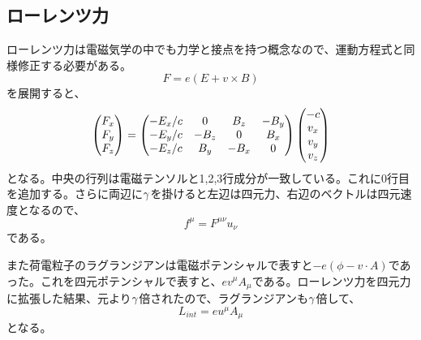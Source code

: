 \subsection{ローレンツ力}
    ローレンツ力は電磁気学の中でも力学と接点を持つ概念なので、運動方程式と同様修正する必要がある。
        \[F = e(E+v\times B)\]
    を展開すると、
    \[
        \begin{pmatrix} F_x\\F_y\\F_z \end{pmatrix}
        = \begin{pmatrix} 
            -E_x/c & 0 & B_z & -B_y\\
            -E_y/c & -B_z & 0 & B_x\\
            -E_z/c & B_y & -B_x & 0 \end{pmatrix}
        \begin{pmatrix} -c\\v_x\\v_y\\v_z \end{pmatrix}
    \]
    となる。中央の行列は電磁テンソルと1,2,3行成分が一致している。これに0行目を追加する。さらに両辺に$\gamma$を掛けると左辺は四元力、右辺のベクトルは四元速度となるので、
        \[f^\mu = F^{\mu\nu}u_\nu\]
    である。

    また荷電粒子のラグランジアンは電磁ポテンシャルで表すと$-e(\phi-v\cdot A)$であった。これを四元ポテンシャルで表すと、$ev^\mu A_\mu$である。ローレンツ力を四元力に拡張した結果、元より$\gamma$倍されたので、ラグランジアンも$\gamma$倍して、
        \[L_{int} = eu^\mu A_\mu\]
    となる。